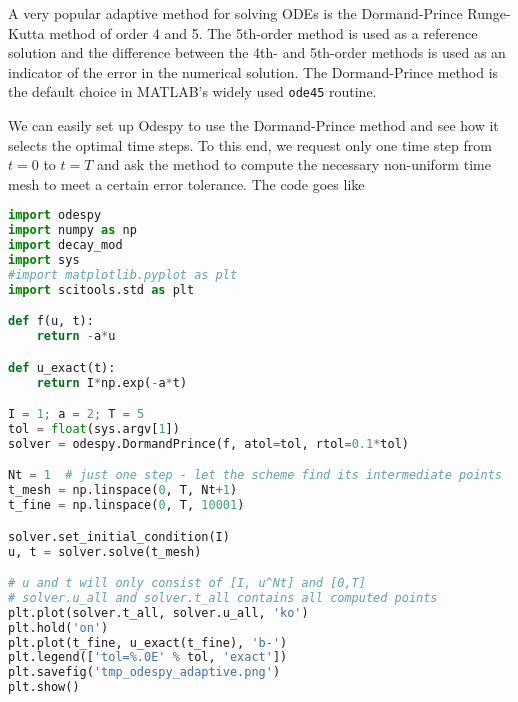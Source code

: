 \documentclass[graybox,sectrefs,envcountresetchap,open=right,final]{svmonodo}
\begin{document}
 

A very popular adaptive method for solving ODEs is the Dormand-Prince
Runge-Kutta method of order 4 and 5. The 5th-order method is used as a
reference solution and the difference between the 4th- and 5th-order
methods is used as an indicator of the error in the numerical
solution.  The Dormand-Prince method is the default choice in MATLAB's
widely used \texttt{ode45} routine.

We can easily set up Odespy to use the Dormand-Prince method and
see how it selects the optimal time steps. To this end, we request
only one time step from $t=0$ to $t=T$ and ask the method to
compute the necessary non-uniform time mesh to meet a certain
error tolerance. The code goes like


































\begin{lstlisting}[language=python,style=blue1bar_bluegreen]
import odespy
import numpy as np
import decay_mod
import sys
#import matplotlib.pyplot as plt
import scitools.std as plt

def f(u, t):
    return -a*u

def u_exact(t):
    return I*np.exp(-a*t)

I = 1; a = 2; T = 5
tol = float(sys.argv[1])
solver = odespy.DormandPrince(f, atol=tol, rtol=0.1*tol)

Nt = 1  # just one step - let the scheme find its intermediate points
t_mesh = np.linspace(0, T, Nt+1)
t_fine = np.linspace(0, T, 10001)

solver.set_initial_condition(I)
u, t = solver.solve(t_mesh)

# u and t will only consist of [I, u^Nt] and [0,T]
# solver.u_all and solver.t_all contains all computed points
plt.plot(solver.t_all, solver.u_all, 'ko')
plt.hold('on')
plt.plot(t_fine, u_exact(t_fine), 'b-')
plt.legend(['tol=%.0E' % tol, 'exact'])
plt.savefig('tmp_odespy_adaptive.png')
plt.show()

\end{lstlisting}
\end{document}
